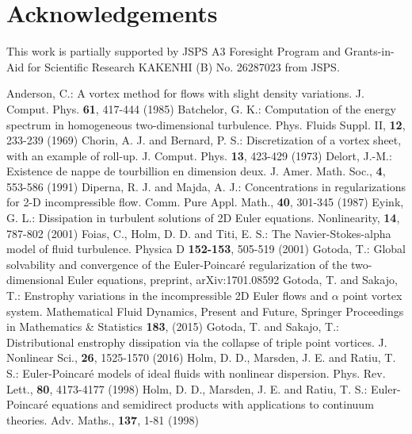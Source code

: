 \documentclass{article}
\theoremstyle{definition}
\begin{document}
\section*{Acknowledgements}
This work is partially supported by JSPS A3 Foresight Program and Grants-in-Aid for Scientific Research KAKENHI (B) No. 26287023 from JSPS.

\begin{thebibliography}{99}
Anderson, C.: A vortex method for flows with slight density variations. J. Comput. Phys. \textbf{61}, 417-444 (1985)
Batchelor, G. K.: Computation of the energy spectrum in homogeneous two-dimensional turbulence. Phys. Fluids Suppl. I\hspace{-.1em}I, \textbf{12}, 233-239 (1969)
Chorin, A. J. and Bernard, P. S.: Discretization of a vortex sheet, with an example of roll-up. J. Comput. Phys. \textbf{13}, 423-429 (1973)
Delort, J.-M.: Existence de nappe de tourbillion en dimension deux. J. Amer. Math. Soc., \textbf{4}, 553-586 (1991)
Diperna, R. J. and Majda, A. J.: Concentrations in regularizations for 2-D incompressible flow. Comm. Pure Appl. Math., \textbf{40}, 301-345 (1987)
Eyink, G. L.: Dissipation in turbulent solutions of 2D Euler equations. Nonlinearity, \textbf{14}, 787-802 (2001)
Foias, C., Holm, D. D. and Titi, E. S.: The Navier-Stokes-alpha model of fluid turbulence. Physica D \textbf{152-153}, 505-519 (2001)
Gotoda, T.: Global solvability and convergence of the Euler-Poincar\'{e}  regularization of the two-dimensional Euler equations, preprint, arXiv:1701.08592
Gotoda, T. and Sakajo, T.: Enstrophy variations in the incompressible 2D Euler flows and $\alpha$ point vortex system. Mathematical Fluid Dynamics, Present and Future, Springer Proceedings in Mathematics \& Statistics \textbf{183}, (2015) 
Gotoda, T. and Sakajo, T.: Distributional enstrophy dissipation via the collapse of triple point vortices. J. Nonlinear Sci., \textbf{26}, 1525-1570 (2016)
Holm, D. D., Marsden, J. E. and Ratiu, T. S.: Euler-Poincar\'{e} models of ideal fluids with nonlinear dispersion. Phys. Rev. Lett., \textbf{80}, 4173-4177 (1998) 
Holm, D. D., Marsden, J. E. and Ratiu, T. S.: Euler-Poincar\'{e} equations and semidirect products with applications to continuum theories. Adv. Maths., \textbf{137}, 1-81 (1998) 

\end{thebibliography}
\end{document}
